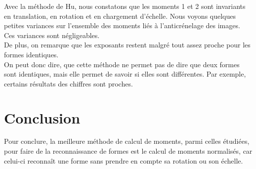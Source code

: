 \documentclass{article}
\begin{document}
  
  Avec la méthode de Hu, nous constatons que les moments 1 et 2 sont invariants en translation, en 
  rotation et en chargement d'échelle. Nous voyons quelques petites variances sur l'ensemble des 
  moments liés à l'anticrénelage des images. Ces variances sont négligeables.\\
  
  De plus, on remarque que les exposants restent malgré tout assez proche pour les formes identiques.\\ 
  
  On peut donc dire, que cette méthode ne permet pas de dire que deux formes sont identiques, mais 
  elle permet de savoir si elles sont différentes. Par exemple, certains résultats des chiffres sont 
  proches.
  
  \section{Conclusion}
  Pour conclure, la meilleure méthode de calcul de moments, parmi celles étudiées, pour faire de la 
  reconnaissance  de formes est le calcul de moments normalisés, car celui-ci reconnaît une forme 
  sans prendre en compte sa rotation ou son échelle.
    
\end{document}
